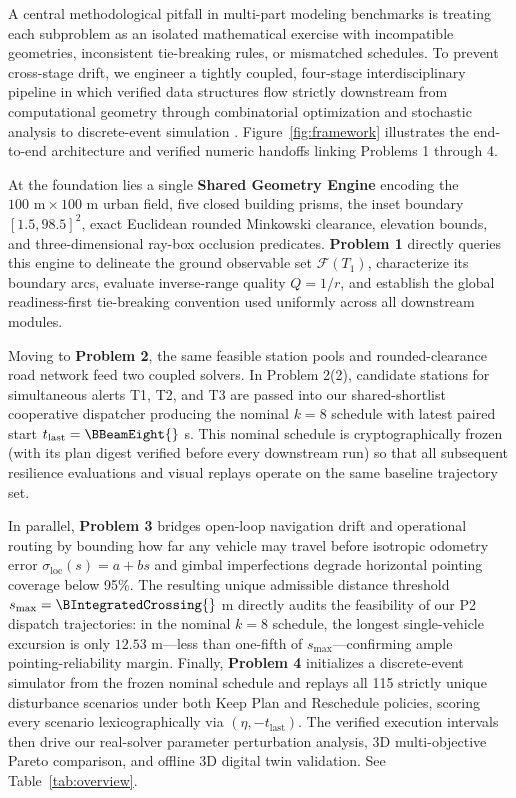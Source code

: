 A central methodological pitfall in multi-part modeling benchmarks is treating each subproblem as an isolated mathematical exercise with incompatible geometries, inconsistent tie-breaking rules, or mismatched schedules. To prevent cross-stage drift, we engineer a tightly coupled, four-stage interdisciplinary pipeline in which verified data structures flow strictly downstream from computational geometry through combinatorial optimization and stochastic analysis to discrete-event simulation \cite{vantendeloo2018}. Figure~\ref{fig:framework} illustrates the end-to-end architecture and verified numeric handoffs linking Problems 1 through 4.

At the foundation lies a single \textbf{Shared Geometry Engine} encoding the $100\text{ m}\times 100\text{ m}$ urban field, five closed building prisms, the inset boundary $[1.5,98.5]^2$, exact Euclidean rounded Minkowski clearance, elevation bounds, and three-dimensional ray-box occlusion predicates. \textbf{Problem 1} directly queries this engine to delineate the ground observable set $\mathcal{F}(T_1)$, characterize its boundary arcs, evaluate inverse-range quality $Q=1/r$, and establish the global readiness-first tie-breaking convention used uniformly across all downstream modules.

Moving to \textbf{Problem 2}, the same feasible station pools and rounded-clearance road network feed two coupled solvers. In Problem 2(2), candidate stations for simultaneous alerts T1, T2, and T3 are passed into our shared-shortlist cooperative dispatcher producing the nominal $k=8$ schedule with latest paired start $t_{\mathrm{last}}=\BBeamEight{}$ s. This nominal schedule is cryptographically frozen (with its plan digest verified before every downstream run) so that all subsequent resilience evaluations and visual replays operate on the same baseline trajectory set.

In parallel, \textbf{Problem 3} bridges open-loop navigation drift and operational routing by bounding how far any vehicle may travel before isotropic odometry error $\sigma_{\mathrm{loc}}(s)=a+bs$ and gimbal imperfections degrade horizontal pointing coverage below 95\%. The resulting unique admissible distance threshold $s_{\max}=\BIntegratedCrossing{}$ m directly audits the feasibility of our P2 dispatch trajectories: in the nominal $k=8$ schedule, the longest single-vehicle excursion is only $12.53$ m—less than one-fifth of $s_{\max}$—confirming ample pointing-reliability margin. Finally, \textbf{Problem 4} initializes a discrete-event simulator \cite{vantendeloo2018} from the frozen nominal schedule and replays all 115 strictly unique disturbance scenarios under both Keep Plan and Reschedule policies, scoring every scenario lexicographically via $(\eta,-t_{\mathrm{last}})$. The verified execution intervals then drive our real-solver parameter perturbation analysis, 3D multi-objective Pareto comparison, and offline 3D digital twin validation. See Table~\ref{tab:overview}.
